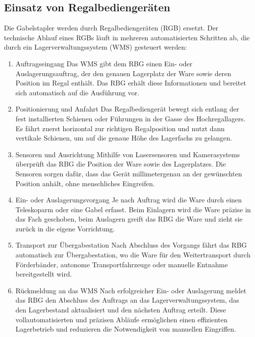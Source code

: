 \subsection{Einsatz von Regalbediengeräten}
Die Gabelstapler werden durch Regalbediengeräten (RGB) ersetzt.
Der technische Ablauf eines RGBs läuft in mehreren automatisierten Schritten ab, die durch ein Lagerverwaltungssystem (WMS) gesteuert werden:
\begin{enumerate}
\item Auftragseingang
Das WMS gibt dem RBG einen Ein- oder Auslagerungsauftrag, der den genauen Lagerplatz der Ware sowie deren Position im Regal enthält. Das RBG erhält diese Informationen und bereitet sich automatisch auf die Ausführung vor.
\item Positionierung und Anfahrt
Das Regalbediengerät bewegt sich entlang der fest installierten Schienen oder Führungen in der Gasse des Hochregallagers. Es fährt zuerst horizontal zur richtigen Regalposition und nutzt dann vertikale Schienen, um auf die genaue Höhe des Lagerfachs zu gelangen.
\item Sensoren und Ausrichtung
Mithilfe von Lasersensoren und Kamerasystems überprüft das RBG die Position der Ware sowie des Lagerplatzes. Die Sensoren sorgen dafür, dass das Gerät millimetergenau an der gewünschten Position anhält, ohne menschliches Eingreifen.
\item Ein- oder Auslagerungsvorgang
Je nach Auftrag wird die Ware durch einen Teleskoparm oder eine Gabel erfasst. Beim Einlagern wird die Ware präzise in das Fach geschoben, beim Auslagern greift das RBG die Ware und zieht sie zurück in die eigene Vorrichtung.
\item Transport zur Übergabestation
Nach Abschluss des Vorgangs fährt das RBG automatisch zur Übergabestation, wo die Ware für den Weitertransport durch Förderbänder, autonome Transportfahrzeuge oder manuelle Entnahme bereitgestellt wird.
\item Rückmeldung an das WMS
Nach erfolgreicher Ein- oder Auslagerung meldet das RBG den Abschluss des Auftrags an das Lagerverwaltungssystem, das den Lagerbestand aktualisiert und den nächsten Auftrag erteilt.
Diese vollautomatisierten und präzisen Abläufe ermöglichen einen effizienten Lagerbetrieb und reduzieren die Notwendigkeit von manuellen Eingriffen.
\end{enumerate}

